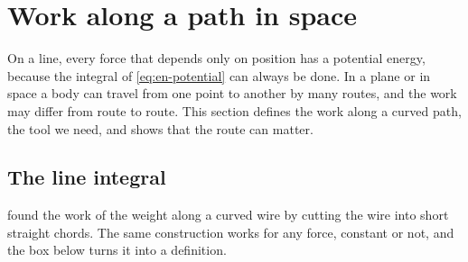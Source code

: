 \section{Work along a path in space}
\label{sec:en-paths}

On a line, every force that depends only on position has a potential
energy, because the integral of \cref{eq:en-potential} can always be
done. In a plane or in space a body can travel from one point to another
by many routes, and the work may differ from route to route. This section
defines the work along a curved path, the tool we need, and shows that
the route can matter.

\subsection*{The line integral}

 found the work of the weight along a curved wire by
cutting the wire into short straight chords. The same construction works
for any force, constant or not, and the box below turns it into a
definition.

